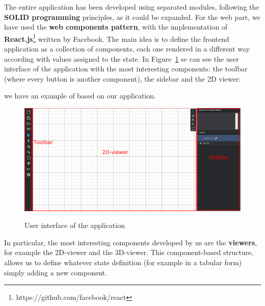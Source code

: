 The entire application has been developed using separated modules, following the \textbf{SOLID programming} principles, as it could be expanded. For the web part, we have used the \textbf{web components pattern}, with the implementation of \textbf{React.js}\footnote{https://github.com/facebook/react} written by Facebook. The main idea is to define the frontend application as a collection of components, each one rendered in a different way according with values assigned to the state. In Figure~\ref{fig_ui} se can see the user interface of the application with the most interesting components: the toolbar (where every button is another component), the sidebar and the 2D viewer:

we have an example of based on our application.\\

\begin{figure}[h]
\centering
\includegraphics[width=\linewidth]{contents/images/ui}\\
\caption{User interface of the application}
\label{fig_ui}
\end{figure}

In particular, the most interesting components developed by us are the \textbf{viewers}, for example the 2D-viewer and the 3D-viewer. This component-based structure, allows us to define whatever state definition (for example in a tabular form) simply adding a new component.\\

